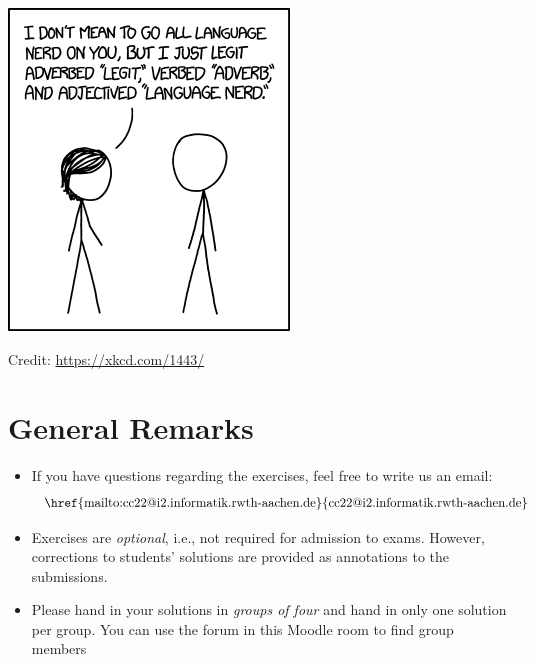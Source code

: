 \documentclass[a4paper]{article}
\begin{document}

\begin{onlysolution}
  \begin{center}
    \includegraphics[scale=0.5]{xkcd_1443}

    \scriptsize Credit: \href{https://xkcd.com/1443/}{https://xkcd.com/1443/}
  \end{center}
\end{onlysolution}

\section*{General Remarks}
\begin{itemize}
  \item If you have questions regarding the exercises, feel free to write us an email:
  \[\text{   \href{mailto:cc22@i2.informatik.rwth-aachen.de}{cc22@i2.informatik.rwth-aachen.de}}
  \]
  \item Exercises are \emph{optional}, i.e., not required for admission to exams. However, corrections to students’ solutions are provided as annotations to the submissions.
  \item Please hand in your solutions in \emph{groups of four} and hand in only one solution per group. You can use the forum in this Moodle room to find group members
\end{itemize}
%

%

%

%
\end{document}
